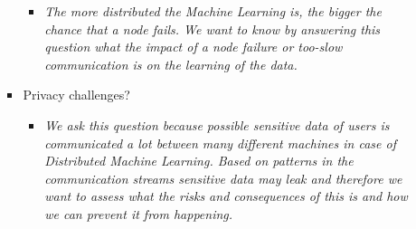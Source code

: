 \begin{itemize}
\begin{itemize}
\begin{itemize}
			\begin{itemize}
				\item \textit{The more distributed the Machine Learning is, the bigger the chance that a node fails. We want to know by answering this question what the impact of a node failure or too-slow communication is on the learning of the data.}
			\end{itemize}
			\item Privacy challenges?
			\begin{itemize}
				\item \textit{We ask this question because possible sensitive data of users is communicated a lot between many different machines in case of Distributed Machine Learning. Based on patterns in the communication streams sensitive data may leak and therefore we want to assess what the risks and consequences of this is and how we can prevent it from happening.}
			\end{itemize}
		\end{itemize}
	\end{itemize}
\end{itemize}